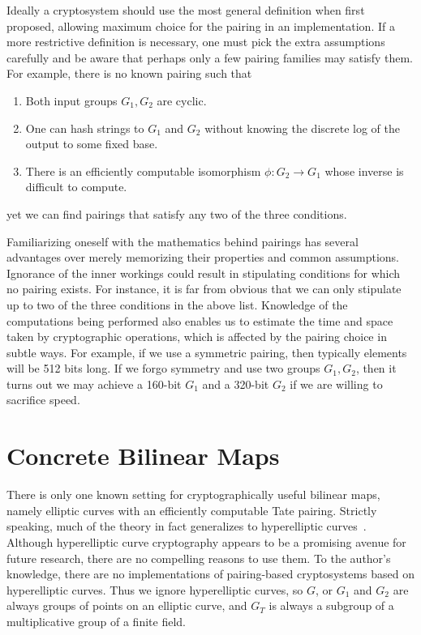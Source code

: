 Ideally a cryptosystem should use the most general definition when first
proposed, allowing maximum choice for the pairing in an implementation. If a
more restrictive definition is necessary, one must pick the extra assumptions
carefully and be aware that perhaps only a few pairing families may satisfy
them. For example, there is no known pairing such that
\begin{enumerate}
\item Both input groups $G_1, G_2$ are cyclic.
\item One can hash strings to $G_1$ and $G_2$ without knowing the
discrete log of the output to some fixed base.
\item There is an efficiently computable isomorphism $\phi:G_2\rightarrow G_1$
whose inverse is difficult to compute.
\end{enumerate}
yet we can find pairings that satisfy any two of the three conditions.

Familiarizing oneself with the mathematics behind pairings has several
advantages over merely memorizing their properties and common assumptions.
Ignorance of the inner workings could result in stipulating conditions for
which no pairing exists. For instance, it is far from obvious that
we can only stipulate up to two of the three conditions in the above list.
Knowledge of the computations being performed also enables us to estimate the
time and space taken by cryptographic operations, which is affected by the
pairing choice in subtle ways. For example, if we use a symmetric pairing, then
typically elements will be 512 bits long. If we forgo symmetry and use two
groups $G_1, G_2$, then it turns out we may achieve a 160-bit $G_1$ and a
320-bit $G_2$ if we are willing to sacrifice speed.

\section{Concrete Bilinear Maps}

There is only one known setting for cryptographically useful bilinear maps,
namely elliptic curves with an efficiently computable Tate pairing.
Strictly speaking, much of the theory in fact generalizes to hyperelliptic
curves~\cite{galbraith,rubinsilverberg,freemanhyper}. Although hyperelliptic
curve cryptography appears to be a promising avenue for future research, there
are no compelling reasons to use them. To the author's knowledge, there are
no implementations of pairing-based cryptosystems based on hyperelliptic
curves. Thus we ignore hyperelliptic curves, so $G$, or $G_1$ and $G_2$ are
always groups of points on an elliptic curve, and $G_T$ is always a subgroup of
a multiplicative group of a finite field.

